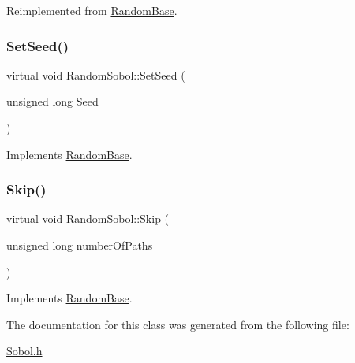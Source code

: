 Reimplemented from \hyperlink{classRandomBase_a8931e429ae130ea44af5469dc6ae728f}{Random\+Base}.

\hypertarget{classRandomSobol_a6ede3a4386bf79e05dd0c1985cc4b3ca}{}\label{classRandomSobol_a6ede3a4386bf79e05dd0c1985cc4b3ca} 
\subsubsection{\texorpdfstring{Set\+Seed()}{SetSeed()}}
{\footnotesize\ttfamily virtual void Random\+Sobol\+::\+Set\+Seed (\begin{DoxyParamCaption}\item[{unsigned long}]{Seed }\end{DoxyParamCaption})\hspace{0.3cm}{\ttfamily [virtual]}}



Implements \hyperlink{classRandomBase_ae93f26c38d1675ef07cb1fd29b894b26}{Random\+Base}.

\hypertarget{classRandomSobol_a1bd5c22ad3a808a4ff9ca8706fdb0b58}{}\label{classRandomSobol_a1bd5c22ad3a808a4ff9ca8706fdb0b58} 
\subsubsection{\texorpdfstring{Skip()}{Skip()}}
{\footnotesize\ttfamily virtual void Random\+Sobol\+::\+Skip (\begin{DoxyParamCaption}\item[{unsigned long}]{number\+Of\+Paths }\end{DoxyParamCaption})\hspace{0.3cm}{\ttfamily [virtual]}}



Implements \hyperlink{classRandomBase_a0531f44e3e2a71d14ef1490aa5d90b77}{Random\+Base}.



The documentation for this class was generated from the following file\+:\begin{DoxyCompactItemize}
\item 
\hyperlink{Sobol_8h}{Sobol.\+h}\end{DoxyCompactItemize}
